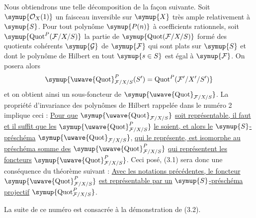 Nous obtiendrons une telle décomposition de la façon suivante. Soit
$\symup{\mathcal O_X(1)}$ un faisceau inversible sur $\symup{X}$ très ample relativement à
$\symup{S}$. Pour tout polynôme $\symup{P(n)}$ à coefficients rationnels, soit
$\symup{\operatorname{Quot}^P(\mathcal F/X/S)}$ la partie de
$\symup{\operatorname{Quot}(\mathcal F/X/S)}$ formé des quotients cohérents
$\symup{\mathcal G}$ de $\symup{\mathcal F}$ qui sont plats sur $\symup{S}$ et dont le polynôme de
Hilbert en tout $\symup{s\in S}$ est égal à $\symup{\mathcal F}$. On posera alors
\[
\symup{\mathop{\text{\uwave{Quot}}}\nolimits^P_{\mathcal F/X/S}(S')
=\operatorname{Quot}^P(\mathcal F'/X'/S')}
\]
et on obtient ainsi un sous-foncteur de
$\symup{\mathop{\text{\uwave{Quot}}}\nolimits_{\mathcal F/X/S}}$. La propriété d'invariance
des polynômes de Hilbert rappelée dans le numéro 2 implique ceci : \uline{Pour que}
$\symup{\mathop{\text{\uwave{Quot}}}\nolimits_{\mathcal F/X/S}}$ \uline{soit représentable, il faut
et il suffit que les}
$\symup{\mathop{\text{\uwave{Quot}}}\nolimits^P_{\mathcal F/X/S}}$ \uline{le soient, et alors le}
$\symup{S}$\uline{-préschéma} $\symup{\mathop{\text{\uwave{Quot}}}\nolimits_{\mathcal F/X/S}}$, \uline{qui le représente, est
isomorphe au préschéma somme des}
$\symup{\mathop{\text{\uwave{Quot}}}\nolimits^P_{\mathcal F/X/S}}$ \uline{qui représentent les foncteurs}
$\symup{\mathop{\text{\uwave{Quot}}}\nolimits^P_{\mathcal F/X/S}}$. Ceci posé, (3.1) sera
donc une conséquence du théorème suivant :
 \uline{Avec les notations précédentes, le foncteur}
$\symup{\mathop{\text{\uwave{Quot}}}\nolimits^P_{\mathcal F/X/S}}$ \uline{est représentable par un}
$\symup{S}$\uline{-préschéma projectif} $\symup{\operatorname{Quot}^P_{\mathcal F/X/S}}$.

La suite de ce numéro est consacrée à la démonstration de (3.2).


